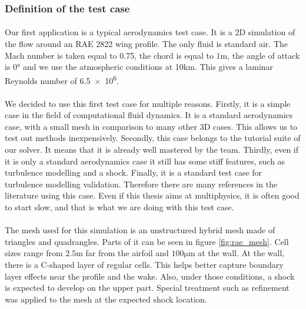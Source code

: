       \subsubsection{Definition of the test case}

        \paragraph{}
        Our first application is a typical aerodynamics test case.
        It is a 2D simulation of the flow around an RAE 2822 wing profile.
        The only fluid is standard air.
        The Mach number is taken equal to 0.75, the chord is equal to $1\si{\meter}$, the angle of attack is $0\si{\degree}$ and we use the atmospheric conditions at 10km.
        This gives a laminar Reynolds number of \num{6.5e6}.

        \paragraph{}
        We decided to use this first test case for multiple reasons.
        Firstly, it is a simple case in the field of computational fluid dynamics.
        It is a standard aerodynamics case, with a small mesh in comparison to many other 3D cases.
        This allows us to test out methods inexpensively.
        Secondly, this case belongs to the tutorial suite of our solver.
        It means that it is already well mastered by the team.
        Thirdly, even if it is only a standard aerodynamics case it still has some stiff features, such as turbulence modelling and a shock.
        Finally, it is a standard test case for turbulence modelling validation.
        Therefore there are many references in the literature using this case.
        Even if this thesis aims at multiphysics, it is often good to start slow, and that is what we are doing with this test case.

        \paragraph{}
        The mesh used for this simulation is an unstructured hybrid mesh made of triangles and quadrangles.
        Parts of it can be seen in figure \ref{fig:rae_mesh}.
        Cell sizes range from $2.5\si{\meter}$ far from the airfoil and $100\si{\micro\meter}$ at the wall.
        At the wall, there is a C-shaped layer of regular cells.
        This helps better capture boundary layer effects near the profile and the wake.
        Also, under those conditions, a shock is expected to develop on the upper part.
        Special treatment such as refinement was applied to the mesh at the expected shock location.

